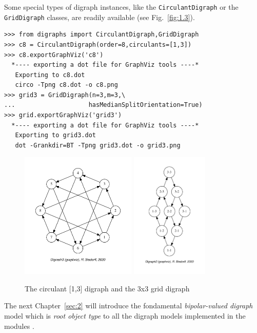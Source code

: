 Some special types of digraph instances, like the \texttt{CirculantDigraph} or the \texttt{GridDigraph} classes, are readily available (see Fig.~\vref{fig:1.3}).
\begin{lstlisting}
>>> from digraphs import CirculantDigraph,GridDigraph
>>> c8 = CirculantDigraph(order=8,circulants=[1,3])
>>> c8.exportGraphViz('c8')
  *---- exporting a dot file for GraphViz tools ----*
   Exporting to c8.dot
   circo -Tpng c8.dot -o c8.png
>>> grid3 = GridDigraph(n=3,m=3,\
...                    hasMedianSplitOrientation=True)
>>> grid.exportGraphViz('grid3')
  *---- exporting a dot file for GraphViz tools ----*
   Exporting to grid3.dot
   dot -Grankdir=BT -Tpng grid3.dot -o grid3.png
\end{lstlisting}
\begin{figure}[h]
  \includegraphics[height=6cm]{Figures/1-3-c8.pdf} \hfill
  \includegraphics[height=6cm]{Figures/1-3-grid3.pdf} \hfill
  \caption{The circulant [1,3] digraph and the 3x3 grid digraph}
\label{fig:1.3}       %
\end{figure}

\vspace{1cm}
The next Chapter~\vref{sec:2} will introduce the fondamental \emph{bipolar-valued digraph} model which is \emph{root object type} to all the digraph models implemented in the \Digraph modules \citep{BIS-2021b}.    



%